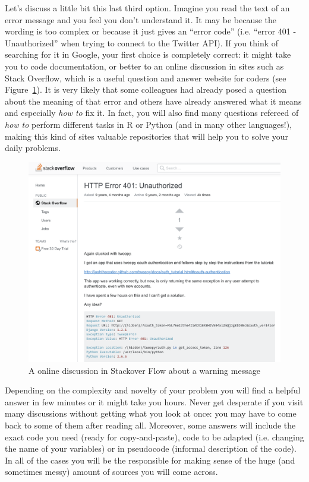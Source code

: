 Let's discuss a little bit this last third option. Imagine you read the text of an error message and you feel you don't understand it. It may be because the wording is too complex or because it just gives an ``error code'' (i.e. ``error 401 - Unauthorized'' when trying to connect to the Twitter API). If you think of searching for it in Google, your first choice is completely correct: it might take you to code documentation, or better to an online discussion in sites such as Stack Overflow, which is a useful question and answer website for coders (see Figure~\ref{fig:stackover}). It is very likely that some colleagues had already posed a question about the meaning of that error and others have already answered what it means and especially \textit{how to} fix it. In fact, you will also find many questions refereed of \textit{how to} perform different tasks in R or Python (and in many other languages!),  making this kind of sites valuable repositories that will help you to solve your daily problems.

\begin{figure}
\centering
\includegraphics[width=0.9\linewidth]{figures/ch4_stackover}
\caption{A online discussion in Stackover Flow about a warning message }
\label{fig:stackover}
\end{figure}

Depending on the complexity and novelty of your problem you will find a helpful answer in few minutes or it might take you hours. Never get desperate if you visit many discussions without getting what you look at once: you may have to come back to some of them after reading all. Moreover, some answers will include the exact code you need (ready for copy-and-paste), code to be adapted (i.e. changing the name of your variables) or in pseudocode (informal description of the code). In all of the cases you will be the responsible for making sense of the huge (and sometimes messy) amount of sources you will come across. 

